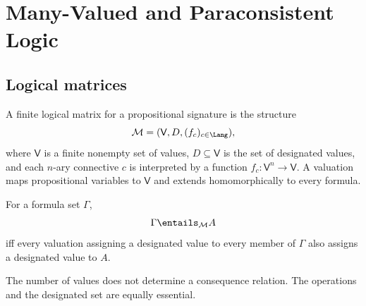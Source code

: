 \chapter{Many-Valued and Paraconsistent Logic}
\label{ch:many-valued-paraconsistent}

\section{Logical matrices}
\label{sec:many-valued-paraconsistent-01}

\begin{definition}
A finite logical matrix for a propositional signature is the structure
\[
  \mathcal M=(\mathsf V,D,(f_c)_{c\in\Lang}),
\]
where \(\mathsf V\) is a finite nonempty set of values,
\(D\subseteq\mathsf V\) is the set of
designated values, and each \(n\)-ary connective \(c\) is interpreted by a
function \(f_c:\mathsf V^n\to\mathsf V\).  A valuation maps propositional
variables to \(\mathsf V\) and extends homomorphically to every formula.
\end{definition}

\begin{definition}
For a formula set \(\Gamma\),
\[
  \Gamma\entails_{\mathcal M}A
\]
iff every valuation assigning a designated value to every member of
\(\Gamma\) also assigns a designated value to \(A\).
\end{definition}

The number of values does not determine a consequence relation.  The
operations and the designated set are equally essential.

